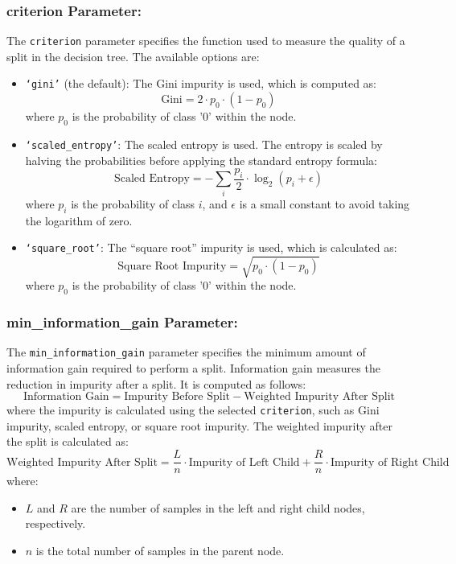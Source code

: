 \documentclass{article}
\begin{document}
\subsubsection*{criterion Parameter:}

The \texttt{criterion} parameter specifies the function used to measure the quality of a split in the decision tree. The available options are:

\begin{itemize}
    \item \texttt{`gini'} (the default): The Gini impurity is used, which is computed as:
    \[
    \text{Gini} = 2 \cdot p_0 \cdot (1 - p_0)
    \]
    where \( p_0 \) is the probability of class '0' within the node.
    
    \item \texttt{`scaled\_entropy'}: The scaled entropy is used. The entropy is scaled by halving the probabilities before applying the standard entropy formula:
    \[
    \text{Scaled Entropy} = -\sum_{i} \frac{p_i}{2} \cdot \log_2(p_i + \epsilon)
    \]
    where \( p_i \) is the probability of class \( i \), and \( \epsilon \) is a small constant to avoid taking the logarithm of zero.
    
    \item \texttt{`square\_root'}: The ``square root'' impurity is used, which is calculated as:
    \[
    \text{Square Root Impurity} = \sqrt{p_0 \cdot (1 - p_0)}
    \]
    where \( p_0 \) is the probability of class '0' within the node.
\end{itemize}

\subsubsection*{min\_information\_gain Parameter:}

The \texttt{min\_information\_gain} parameter specifies the minimum amount of information gain required to perform a split. Information gain measures the reduction in impurity after a split. It is computed as follows:
\[
    \text{Information Gain} = \text{Impurity Before Split} - \text{Weighted Impurity After Split}
\]
where the impurity is calculated using the selected \texttt{criterion}, such as Gini impurity, scaled entropy, or square root impurity. The weighted impurity after the split is calculated as:
\[
    \text{Weighted Impurity After Split} = \frac{L}{n} \cdot \text{Impurity of Left Child} + \frac{R}{n} \cdot \text{Impurity of Right Child}
\]
where:
\begin{itemize}
    \item \( L \) and \( R \) are the number of samples in the left and right child nodes, respectively.
    \item \( n \) is the total number of samples in the parent node.
\end{itemize}
\end{document}
